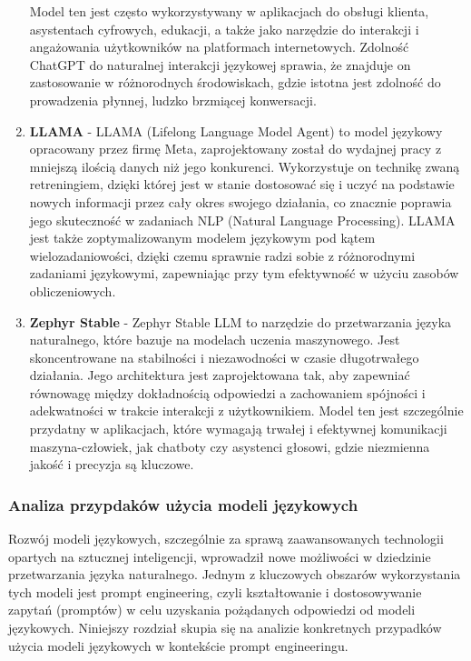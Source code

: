 \begin{enumerate}
    Model ten jest często wykorzystywany w aplikacjach do obsługi klienta, asystentach cyfrowych, edukacji, a także jako narzędzie do interakcji i angażowania użytkowników na platformach internetowych. Zdolność ChatGPT do naturalnej interakcji językowej sprawia, że znajduje on zastosowanie w różnorodnych środowiskach, gdzie istotna jest zdolność do prowadzenia płynnej, ludzko brzmiącej konwersacji.
    \\
    \item {\bf LLAMA} - LLAMA (Lifelong Language Model Agent) to model językowy opracowany przez firmę Meta, zaprojektowany został do wydajnej pracy z mniejszą ilością danych niż jego konkurenci. Wykorzystuje on technikę zwaną retreningiem, dzięki której jest w stanie dostosować się i uczyć na podstawie nowych informacji przez cały okres swojego działania, co znacznie poprawia jego skuteczność w zadaniach NLP (Natural Language Processing). LLAMA jest także zoptymalizowanym modelem językowym pod kątem wielozadaniowości, dzięki czemu sprawnie radzi sobie z różnorodnymi zadaniami językowymi, zapewniając przy tym efektywność w użyciu zasobów obliczeniowych.
    \\
    \item {\bf Zephyr Stable} - Zephyr Stable LLM to narzędzie do przetwarzania języka naturalnego, które bazuje na modelach uczenia maszynowego. Jest skoncentrowane na stabilności i niezawodności w czasie długotrwałego działania. Jego architektura jest zaprojektowana tak, aby zapewniać równowagę między dokładnością odpowiedzi a zachowaniem spójności i adekwatności w trakcie interakcji z użytkownikiem. Model ten jest szczególnie przydatny w aplikacjach, które wymagają trwałej i efektywnej komunikacji maszyna-człowiek, jak chatboty czy asystenci głosowi, gdzie niezmienna jakość i precyzja są kluczowe.
    \\

\end{enumerate}

\subsubsection{Analiza przypdaków użycia modeli językowych}

Rozwój modeli językowych, szczególnie za sprawą zaawansowanych technologii opartych na sztucznej inteligencji, wprowadził nowe możliwości w dziedzinie przetwarzania języka naturalnego. Jednym z kluczowych obszarów wykorzystania tych modeli jest prompt engineering, czyli kształtowanie i dostosowywanie zapytań (promptów) w celu uzyskania pożądanych odpowiedzi od modeli językowych. Niniejszy rozdział skupia się na analizie konkretnych przypadków użycia modeli językowych w kontekście prompt engineeringu.

